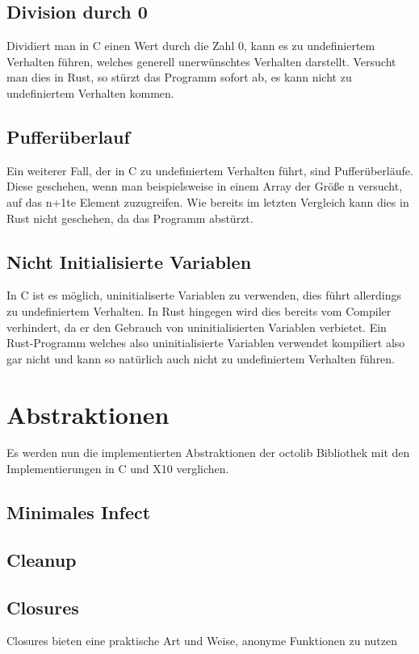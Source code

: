 \subsection{Division durch 0}

Dividiert man in C einen Wert durch die Zahl 0, kann es zu undefiniertem Verhalten führen, welches generell
unerwünschtes Verhalten darstellt. Versucht man dies in Rust, so stürzt das Programm sofort ab, es kann nicht zu undefiniertem
Verhalten kommen.

\subsection{Pufferüberlauf}

Ein weiterer Fall, der in C zu undefiniertem Verhalten führt, sind Pufferüberläufe. Diese geschehen, wenn man beispielsweise
in einem Array der Größe n versucht, auf das n+1te Element zuzugreifen. Wie bereits im letzten Vergleich kann dies in 
Rust nicht geschehen, da das Programm abstürzt.

\subsection{Nicht Initialisierte Variablen}

In C ist es möglich, uninitialiserte Variablen zu verwenden, dies führt allerdings zu undefiniertem Verhalten. In Rust hingegen
wird dies bereits vom Compiler verhindert, da er den Gebrauch von uninitialisierten Variablen verbietet. Ein Rust-Programm
welches also uninitialisierte Variablen verwendet kompiliert also gar nicht und kann so natürlich auch nicht
zu undefiniertem Verhalten führen.


\section{Abstraktionen}

Es werden nun die implementierten Abstraktionen der octolib Bibliothek mit den Implementierungen in C und X10 verglichen.

\subsection{Minimales Infect}

\subsection{Cleanup}

\subsection{Closures}

Closures bieten eine praktische Art und Weise, anonyme Funktionen zu nutzen



